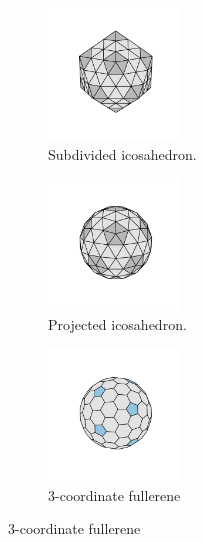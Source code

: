 \begin{figure}[bt]
     \centering
     
      \begin{subfigure}[b]{0.3\textwidth}
         \centering
         \includegraphics[height=3.5cm]{./figures/general_networks/full92_iso.pdf}
         \caption{Subdivided icosahedron.}
         \label{fig:topo1}
     \end{subfigure}
     \hfill
     \begin{subfigure}[b]{0.3\textwidth}
         \centering
         \includegraphics[height=3.5cm]{./figures/general_networks/full92_iso_min.pdf}
         \caption{Projected icosahedron.}
         \label{fig:topo2}
     \end{subfigure}
     \hfill
     \begin{subfigure}[b]{0.3\textwidth}
         \centering
         \includegraphics[height=3.5cm]{./figures/general_networks/full92.pdf}
         \caption{3\--coordinate fullerene}
         \label{fig:topo3}
     \end{subfigure}
     \hfill
     

\end{figure}
